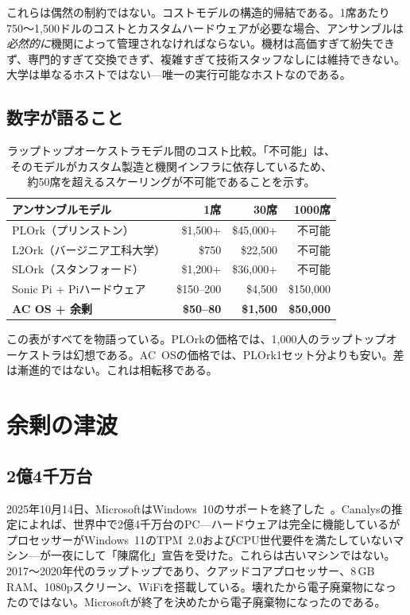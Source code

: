 \documentclass[10pt,letterpaper,twocolumn]{article}
\begin{document}
これらは偶然の制約ではない。コストモデルの構造的帰結である。1席あたり750〜1,500ドルのコストとカスタムハードウェアが必要な場合、アンサンブルは\emph{必然的に}機関によって管理されなければならない。機材は高価すぎて紛失できず、専門的すぎて交換できず、複雑すぎて技術スタッフなしには維持できない。大学は単なるホストではない---唯一の実行可能なホストなのである。

\subsection{数字が語ること}

\begin{table}[h]
\small
\centering
\begin{tabular}{lrrr}
\toprule
\textbf{アンサンブルモデル} & \textbf{1席} & \textbf{30席} & \textbf{1000席} \\
\midrule
PLOrk（プリンストン）       & \$1,500+ & \$45,000+ & 不可能 \\
L2Ork（バージニア工科大学）   & \$750      & \$22,500  & 不可能 \\
SLOrk（スタンフォード）        & \$1,200+ & \$36,000+ & 不可能 \\
Sonic Pi + Piハードウェア   & \$150--200 & \$4,500   & \$150,000 \\
\textbf{AC OS + 余剰} & \textbf{\$50--80} & \textbf{\$1,500} & \textbf{\$50,000} \\
\bottomrule
\end{tabular}
\caption{ラップトップオーケストラモデル間のコスト比較。「不可能」は、そのモデルがカスタム製造と機関インフラに依存しているため、約50席を超えるスケーリングが不可能であることを示す。}
\label{tab:cost}
\end{table}

この表がすべてを物語っている。PLOrkの価格では、1,000人のラップトップオーケストラは幻想である。AC~OSの価格では、PLOrk1セット分よりも安い。差は漸進的ではない。これは相転移である。


\section{余剰の津波}
\label{sec:surplus}

\subsection{2億4千万台}

2025年10月14日、MicrosoftはWindows~10のサポートを終了した~\citep{canalys2024windows}。Canalysの推定によれば、世界中で2億4千万台のPC---ハードウェアは完全に機能しているがプロセッサーがWindows~11のTPM~2.0およびCPU世代要件を満たしていないマシン---が一夜にして「陳腐化」宣告を受けた。これらは古いマシンではない。2017〜2020年代のラップトップであり、クアッドコアプロセッサー、8\,GB RAM、1080pスクリーン、WiFiを搭載している。壊れたから電子廃棄物になったのではない。Microsoftが終了を決めたから電子廃棄物になったのである。
\end{document}
